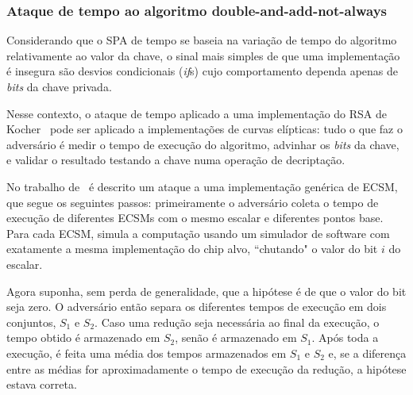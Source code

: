 \documentclass{SBCbookchapter}
\begin{document}
\subsubsection{Ataque de tempo ao algoritmo double-and-add-not-always}
Considerando que o SPA de tempo se baseia na variação de tempo do algoritmo  relativamente ao valor da chave, o sinal mais simples de que uma implementação é insegura são desvios condicionais (\textit{if}s) cujo comportamento dependa apenas de  \textit{bits} da chave privada.

Nesse contexto, o ataque de tempo aplicado a uma implementação do RSA de Kocher~\cite{Kocher96} pode ser aplicado a implementações de curvas elípticas: tudo o que faz o adversário é medir o tempo de execução do algoritmo, advinhar os \textit{bits} da chave, e validar o resultado testando a chave numa operação de decriptação.

No trabalho de~\cite{danger2013synthesis} é descrito um ataque a uma implementação genérica de ECSM, que segue os seguintes passos: primeiramente o adversário coleta o tempo de execução de diferentes ECSMs com o mesmo escalar e diferentes pontos base. Para cada ECSM, simula a computação usando um simulador de software com exatamente a mesma implementação do chip alvo, ``chutando" o valor do bit $i$ do escalar. 

Agora suponha, sem perda de generalidade, que a hipótese é de que o valor do bit seja zero. O adversário então separa os diferentes tempos de execução em dois conjuntos, $S_1$ e $S_2$. Caso uma redução seja necessária ao final da execução, o tempo obtido é armazenado em $S_2$, senão é armazenado em $S_1$. Após toda a execução, é feita uma média dos tempos armazenados em $S_1$ e $S_2$ e, se a diferença entre as médias for aproximadamente o tempo de execução da redução, a hipótese estava correta.

\end{document}
